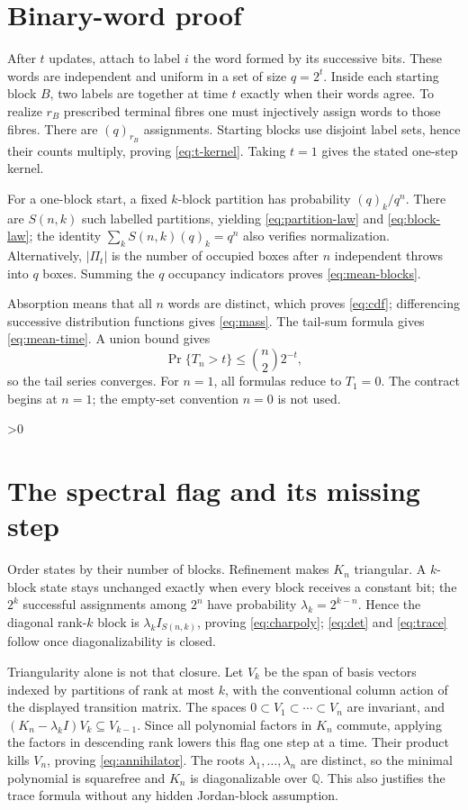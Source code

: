 \documentclass[10pt]{article}
\providecommand{\CRevisionRound}{2}
\newcommand{\fall}[2]{(#1)_{#2}}
\begin{document}
\section{Binary-word proof}

After $t$ updates, attach to label $i$ the word formed by its successive
bits.  These words are independent and uniform in a set of size $q=2^t$.
Inside each starting block $B$, two labels are together at time $t$ exactly
when their words agree.  To realize $r_B$ prescribed terminal fibres one
must injectively assign words to those fibres.  There are $\fall q{r_B}$
assignments.  Starting blocks use disjoint label sets, hence their counts
multiply, proving \eqref{eq:t-kernel}.  Taking $t=1$ gives the stated
one-step kernel.

For a one-block start, a fixed $k$-block partition has probability
$\fall qk/q^n$.  There are $S(n,k)$ such labelled partitions, yielding
\eqref{eq:partition-law} and \eqref{eq:block-law}; the identity
$\sum_k S(n,k)\fall qk=q^n$ also verifies normalization.  Alternatively,
$|\Pi_t|$ is the number of occupied boxes after $n$ independent throws into
$q$ boxes.  Summing the $q$ occupancy indicators proves
\eqref{eq:mean-blocks}.

Absorption means that all $n$ words are distinct, which proves
\eqref{eq:cdf}; differencing successive distribution functions gives
\eqref{eq:mass}.  The tail-sum formula gives \eqref{eq:mean-time}.  A union
bound gives
\[
  \Pr\{T_n>t\}\leq \binom n2 2^{-t},
\]
so the tail series converges.  For $n=1$, all formulas reduce to $T_1=0$.
The contract begins at $n=1$; the empty-set convention $n=0$ is not used.

\ifnum\CRevisionRound>0
\section{The spectral flag and its missing step}

Order states by their number of blocks.  Refinement makes $K_n$ triangular.
A $k$-block state stays unchanged exactly when every block receives a
constant bit; the $2^k$ successful assignments among $2^n$ have probability
\(\lambda_k=2^{k-n}\).  Hence the diagonal rank-$k$ block is
$\lambda_k I_{S(n,k)}$, proving \eqref{eq:charpoly};
\eqref{eq:det} and \eqref{eq:trace} follow once diagonalizability is closed.

Triangularity alone is not that closure.  Let $V_k$ be the span of basis
vectors indexed by partitions of rank at most $k$, with the conventional
column action of the displayed transition matrix.  The spaces
$0\subset V_1\subset\cdots\subset V_n$ are invariant, and
$(K_n-\lambda_k I)V_k\subseteq V_{k-1}$.  Since all polynomial factors in
$K_n$ commute, applying the factors in descending rank lowers this flag one
step at a time.  Their product kills $V_n$, proving
\eqref{eq:annihilator}.  The roots $\lambda_1,\ldots,\lambda_n$ are distinct,
so the minimal polynomial is squarefree and $K_n$ is diagonalizable over
$\mathbb Q$.  This also justifies the trace formula without any hidden
Jordan-block assumption.
\end{document}
